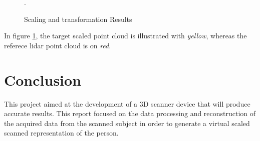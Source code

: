 \documentclass[12pt]{report}
\begin{document}
\begin{figure}[H]%
  \centering
  \qquad
  \qquad
  \qquad
  \qquad
\caption{Scaling and transformation Results}.
\label{fig:scale_results} 
\end{figure}

In figure \ref{fig:scale_results}, the target scaled point cloud is illustrated with \textit{yellow}, whereas the referece lidar point cloud is on \textit{red}.




\chapter{Conclusion}
This project aimed at the development of a 3D scanner device that will produce accurate results. 
This report focused on the data processing and reconstruction of the acquired data from the scanned subject in order to generate a virtual scaled scanned representation of the person.
\end{document}
